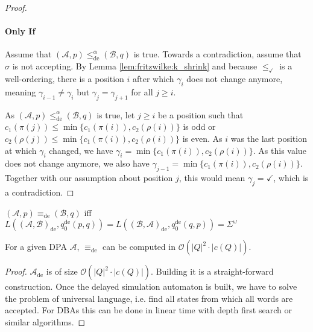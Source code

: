 \begin{proof}
	\paragraph{Only If} Assume that $(\mathcal{A}, p) \leq_\text{de}^\alpha (\mathcal{B}, q)$ is true. Towards a contradiction, assume that $\sigma$ is not accepting. By Lemma \ref{lem:fritzwilke:k_shrink} and because $\leq_\checkmark$ is a well-ordering, there is a position $i$ after which $\gamma_i$ does not change anymore, meaning $\gamma_{i-1} \neq \gamma_i$ but $\gamma_j = \gamma_{j+1}$ for all $j \geq i$.
	
	As $(\mathcal{A}, p) \leq_\text{de}^\alpha (\mathcal{B}, q)$ is true, let $j \geq i$ be a position such that $c_1(\pi(j)) \leq \min \{c_1(\pi(i)), c_2(\rho(i))\}$ is odd or $c_2(\rho(j)) \leq \min \{c_1(\pi(i)), c_2(\rho(i))\}$ is even. As $i$ was the last position at which $\gamma_i$ changed, we have $\gamma_i = \min \{c_1(\pi(i)), c_2(\rho(i))\}$. As this value does not change anymore, we also have $\gamma_{j-1} = \min \{c_1(\pi(i)), c_2(\rho(i))\}$. Together with our assumption about position $j$, this would mean $\gamma_j = \checkmark$, which is a contradiction.
\end{proof}

\begin{cor}
	$(\mathcal{A}, p) \equiv_\text{de} (\mathcal{B}, q)$ iff $L((\mathcal{A}, \mathcal{B})_\text{de}, q_0^\text{de}(p, q)) = L((\mathcal{B}, \mathcal{A})_\text{de}, q_0^\text{de}(q, p)) = \Sigma^\omega$
\end{cor}

\vspace{10pt}

\begin{theorem}
	For a given DPA $\mathcal{A}$, $\equiv_\text{de}$ can be computed in $\mathcal{O}(|Q|^2 \cdot |c(Q)|)$.
\end{theorem}

\begin{proof}
	$\mathcal{A}_\text{de}$ is of size $\mathcal{O}(|Q|^2 \cdot |c(Q)|)$. Building it is a straight-forward construction. Once the delayed simulation automaton is built, we have to solve the problem of universal language, i.e. find all states from which all words are accepted. For DBAs this can be done in linear time with depth first search or similar algorithms.
\end{proof}



